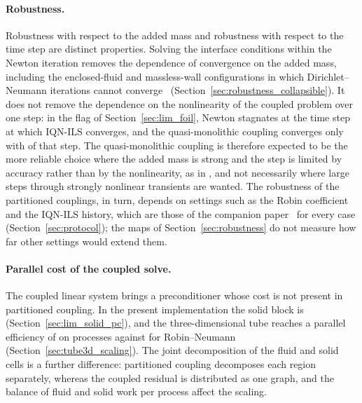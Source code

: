 \paragraph{Robustness.}
Robustness with respect to the added mass and robustness with respect to the time step are distinct properties.
Solving the interface conditions within the Newton iteration removes the dependence of convergence on the added mass, including the enclosed-fluid and massless-wall configurations in which Dirichlet--Neumann iterations cannot converge~\citep{Kuttler2006} (Section~\ref{sec:robustness_collapsible}).
It does not remove the dependence on the nonlinearity of the coupled problem over one step: in the flag of Section~\ref{sec:lim_foil}, Newton stagnates at the time step at which IQN-ILS converges, and the quasi-monolithic coupling converges only with  of that step.
The quasi-monolithic coupling is therefore expected to be the more reliable choice where the added mass is strong and the step is limited by accuracy rather than by the nonlinearity, as in , and not necessarily where large steps through strongly nonlinear transients are wanted.
The robustness of the partitioned couplings, in turn, depends on settings such as the Robin coefficient and the IQN-ILS history, which are those of the companion paper~ for every case (Section~\ref{sec:protocol}); the maps of Section~\ref{sec:robustness} do not measure how far other settings would extend them.

\paragraph{Parallel cost of the coupled solve.}
The coupled linear system brings a preconditioner whose cost is not present in partitioned coupling.
In the present implementation the solid block is  (Section~\ref{sec:lim_solid_pc}), and the three-dimensional tube reaches a parallel efficiency of  on  processes against  for Robin--Neumann (Section~\ref{sec:tube3d_scaling}).
The joint decomposition of the fluid and solid cells is a further difference: partitioned coupling decomposes each region separately, whereas the coupled residual is distributed as one graph, and the balance of fluid and solid work per process  affect the scaling.

